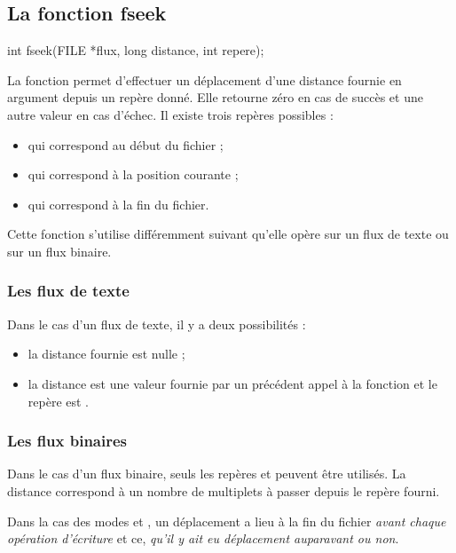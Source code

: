 \subsection{La fonction fseek}
\label{la-fonction-fseek}

\begin{C}
int fseek(FILE *flux, long distance, int repere);
\end{C}

La fonction  permet d'effectuer un déplacement d'une
distance fournie en argument depuis un repère donné. Elle retourne zéro
en cas de succès et une autre valeur en cas d'échec. Il existe trois
repères possibles :

\begin{itemize}
\item
   qui correspond au début du fichier ;
\item
   qui correspond à la position courante ;
\item
   qui correspond à la fin du fichier.
\end{itemize}

Cette fonction s'utilise différemment suivant qu'elle opère sur un flux
de texte ou sur un flux binaire.

\subsubsection{Les flux de texte}
\label{les-flux-de-texte}

Dans le cas d'un flux de texte, il y a deux possibilités :

\begin{itemize}
\item
  la distance fournie est nulle ;
\item
  la distance est une valeur fournie par un précédent appel à la
  fonction  et le repère est .
\end{itemize}

\subsubsection{Les flux binaires}
\label{les-flux-binaires}

Dans le cas d'un flux binaire, seuls les repères  et
 peuvent être utilisés. La distance correspond à un
nombre de multiplets à passer depuis le repère fourni.

\begin{attentionbox}
Dans la cas des modes  et , un déplacement a lieu 
à la fin du fichier \emph{avant chaque opération d'écriture} et ce, 
\emph{qu'il y ait eu déplacement auparavant ou non}.
\end{attentionbox}


